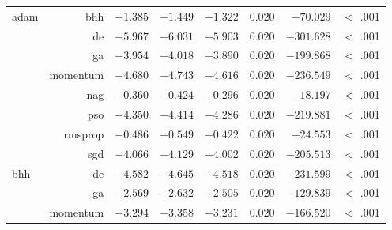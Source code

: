 \begin{table}[htbp]
{\begin{tabular}{lrrrrrrr}
			adam                 & bhh                  & $-1.385$             & $-1.449$                                        & $-1.322$             & $0.020$              & $-70.029$            & $<$ .001    \\
			$ $                  & de                   & $-5.967$             & $-6.031$                                        & $-5.903$             & $0.020$              & $-301.628$           & $<$ .001    \\
			                     & ga                   & $-3.954$             & $-4.018$                                        & $-3.890$             & $0.020$              & $-199.868$           & $<$ .001    \\
			                     & momentum             & $-4.680$             & $-4.743$                                        & $-4.616$             & $0.020$              & $-236.549$           & $<$ .001    \\
			                     & nag                  & $-0.360$             & $-0.424$                                        & $-0.296$             & $0.020$              & $-18.197$            & $<$ .001    \\
			                     & pso                  & $-4.350$             & $-4.414$                                        & $-4.286$             & $0.020$              & $-219.881$           & $<$ .001    \\
			                     & rmsprop              & $-0.486$             & $-0.549$                                        & $-0.422$             & $0.020$              & $-24.553$            & $<$ .001    \\
			                     & sgd                  & $-4.066$             & $-4.129$                                        & $-4.002$             & $0.020$              & $-205.513$           & $<$ .001    \\
			bhh                  & de                   & $-4.582$             & $-4.645$                                        & $-4.518$             & $0.020$              & $-231.599$           & $<$ .001    \\
			$ $                  & ga                   & $-2.569$             & $-2.632$                                        & $-2.505$             & $0.020$              & $-129.839$           & $<$ .001    \\
			                     & momentum             & $-3.294$             & $-3.358$                                        & $-3.231$             & $0.020$              & $-166.520$           & $<$ .001    \\

\end{tabular}}
\end{table}
